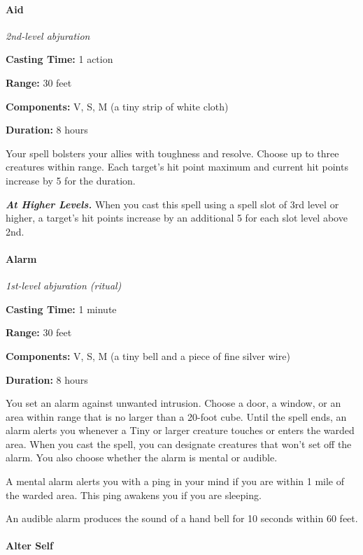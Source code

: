 \documentclass[
]{article}
\begin{document}
\hypertarget{aid}{%
\paragraph{Aid}\label{aid}}

\emph{2nd-level abjuration}

\textbf{Casting Time:} 1 action

\textbf{Range:} 30 feet

\textbf{Components:} V, S, M (a tiny strip of white cloth)

\textbf{Duration:} 8 hours

Your spell bolsters your allies with toughness and resolve. Choose up to
three creatures within range. Each target's hit point maximum and
current hit points increase by 5 for the duration.

\emph{\textbf{At Higher Levels.}} When you cast this spell using a spell
slot of 3rd level or higher, a target's hit points increase by an
additional 5 for each slot level above 2nd.

\hypertarget{alarm}{%
\paragraph{Alarm}\label{alarm}}

\emph{1st-level abjuration (ritual)}

\textbf{Casting Time:} 1 minute

\textbf{Range:} 30 feet

\textbf{Components:} V, S, M (a tiny bell and a piece of fine silver
wire)

\textbf{Duration:} 8 hours

You set an alarm against unwanted intrusion. Choose a door, a window, or
an area within range that is no larger than a 20-foot cube. Until the
spell ends, an alarm alerts you whenever a Tiny or larger creature
touches or enters the warded area. When you cast the spell, you can
designate creatures that won't set off the alarm. You also choose
whether the alarm is mental or audible.

A mental alarm alerts you with a ping in your mind if you are within 1
mile of the warded area. This ping awakens you if you are sleeping.

An audible alarm produces the sound of a hand bell for 10 seconds within
60 feet.

\hypertarget{alter-self}{%
\paragraph{Alter Self}\label{alter-self}}
\end{document}
